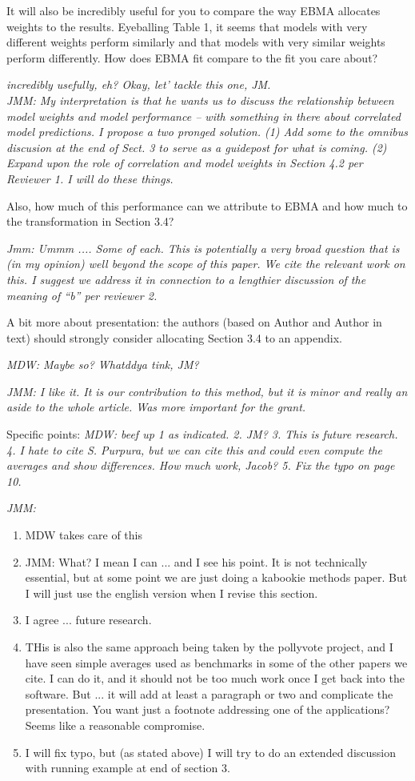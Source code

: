 \documentclass[10pt]{article}
\begin{document}
It will also be incredibly useful for you to compare the way EBMA allocates weights to the results.  Eyeballing Table 1, it seems that models with very different weights perform similarly and that models with very similar weights perform differently.  How does EBMA fit compare to the fit you care about?  

{\it incredibly usefully, eh?  Okay, let' tackle this one, JM.}\\
{\it JMM: My interpretation is that he wants us to discuss the relationship between model weights and model performance -- with something in there about correlated model predictions.  I propose a two pronged solution.  (1) Add some to the omnibus discusion at the end of Sect. 3 to serve as a guidepost for what is coming.  (2) Expand upon the role of correlation and model weights in Section 4.2 per Reviewer 1.  I will do these things.}


Also, how much of this performance can we attribute to EBMA and how much to the transformation in Section 3.4?

{\it Jmm: Ummm .... Some of each.   This is potentially a very broad question that is (in my opinion) well beyond the scope of this paper. We cite the relevant work on this.  I suggest we address it in connection to a lengthier discussion of the meaning of ``b'' per reviewer 2.  }

A bit more about presentation: the authors (based on Author and Author in text) should strongly consider allocating Section 3.4 to an appendix. 

{\it MDW: Maybe so? Whatddya tink, JM?}

{\it JMM: I like it.  It is our contribution to this method, but it is minor and really an aside to the whole article.  Was more important for the grant.}

Specific points:
{\it MDW: beef up 1 as indicated. 2. JM? 3. This is future research. 4. I hate to cite S. Purpura, but we can cite this and could even compute the averages and show differences. How much work, Jacob? 5. Fix the typo on page 10.}

{\it JMM: 
\begin{enumerate}
\item MDW takes care of this
\item JMM: What?  I mean I can ... and I see his point.  It is not technically essential, but at some point we are just doing a kabookie methods paper.  But I will just use the english version when I revise this section.
\item I agree ... future research.
\item THis is also the same approach being taken by the pollyvote project, and I have seen simple averages used as benchmarks in some of the other papers we cite.  I can do it, and it should not be too much work once I get back into the software.  But ... it will add at least a paragraph or two and complicate the presentation.  You want just a footnote addressing one of the applications? Seems like a reasonable compromise.
\item I will fix typo, but (as stated above) I will try to do an extended discussion with running example at end of section 3.
\end{enumerate}
}
\end{document}
